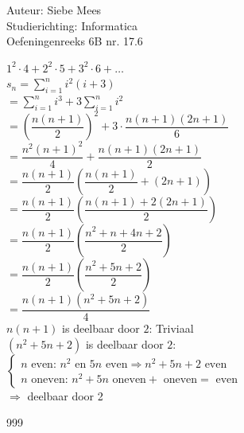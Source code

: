\documentclass[a4paper]{article}
\begin{document}
  
\noindent \large Auteur: Siebe Mees \\
\noindent \large Studierichting: Informatica\\
\noindent \large Oefeningenreeks 6B nr. 17.6\\

\medskip

\normalsize

$1^2 \cdot 4 + 2^2 \cdot 5 + 3^2 \cdot 6 + \ldots$\\

$s_n = \displaystyle\sum_{i=1}^{n} i^2(i+3)$\\

$= \displaystyle\sum_{i=1}^{n} i^3 + 3 \displaystyle\sum_{i=1}^{n} i^2$\\

$= \left(\dfrac{n(n+1)}{2}\right)^2 + 3 \cdot \dfrac{n(n+1)(2n+1)}{6}$\\

$= \dfrac{n^2(n+1)^2}{4} + \dfrac{n(n+1)(2n+1)}{2}$\\

$= \dfrac{n(n+1)}{2} \left(\dfrac{n(n+1)}{2} + (2n+1)\right)$\\

$= \dfrac{n(n+1)}{2} \left(\dfrac{n(n+1) + 2(2n+1)}{2}\right)$\\

$= \dfrac{n(n+1)}{2} \left(\dfrac{n^2 + n + 4n + 2}{2}\right)$\\

$= \dfrac{n(n+1)}{2} \left(\dfrac{n^2 + 5n + 2}{2}\right)$\\

$= \dfrac{n(n+1)(n^2 + 5n + 2)}{4}$\\


$n(n+1)$ is deelbaar door $2$: Triviaal\\

$(n^2 + 5n + 2)$ is deelbaar door $2$: \\

$\left \{
\begin{array}{l}
n \text{ even: } n^2 \text{ en } 5n \text{ even} \Rightarrow n^2 + 5n + 2 \text{ even} \\

n \text{ oneven: } n^2 + 5n \text{ oneven} + \text{ oneven} = \text{ even}
\end{array}
\right .$\\

$\Rightarrow $ deelbaar door 2\\

\begin{thebibliography}{999}
\end{thebibliography}
\end{document}
